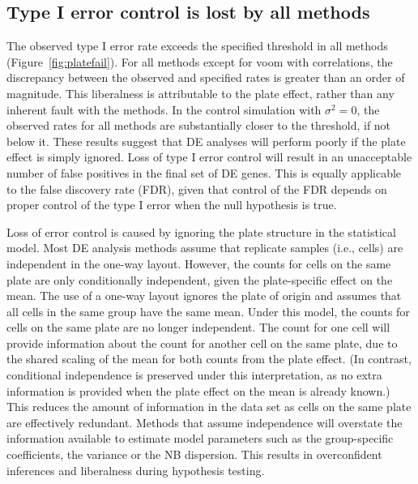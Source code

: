 \documentclass[oupdraft]{bio}
\begin{document}

\subsection{Type I error control is lost by all methods}
The observed type I error rate exceeds the specified threshold in all methods (Figure~\ref{fig:platefail}).
For all methods except for voom with correlations, the discrepancy between the observed and specified rates is greater than an order of magnitude.
This liberalness is attributable to the plate effect, rather than any inherent fault with the methods.
In the control simulation with $\sigma^2=0$, the observed rates for all methods are substantially closer to the threshold, if not below it.
These results suggest that DE analyses will perform poorly if the plate effect is simply ignored.
Loss of type I error control will result in an unacceptable number of false positives in the final set of DE genes.
This is equally applicable to the false discovery rate (FDR), given that control of the FDR depends on proper control of the type I error when the null hypothesis is true.

Loss of error control is caused by ignoring the plate structure in the statistical model.
Most DE analysis methods assume that replicate samples (i.e., cells) are independent in the one-way layout.
However, the counts for cells on the same plate are only conditionally independent, given the plate-specific effect on the mean.
The use of a one-way layout ignores the plate of origin and assumes that all cells in the same group have the same mean.
Under this model, the counts for cells on the same plate are no longer independent.
The count for one cell will provide information about the count for another cell on the same plate,
    due to the shared scaling of the mean for both counts from the plate effect.
(In contrast, conditional independence is preserved under this interpretation, as no extra information is provided when the plate effect on the mean is already known.)
This reduces the amount of information in the data set as cells on the same plate are effectively redundant.
Methods that assume independence will overstate the information available to estimate model parameters such as the group-specific coefficients, the variance or the NB dispersion.
This results in overconfident inferences and liberalness during hypothesis testing.
\end{document}
